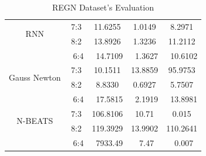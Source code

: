 \documentclass{ieeeojies}
\begin{document}
\begin{table}[H]
\begin{tabular}{|c|c|c|c|c|}
         \hline
         \multirow{2}{*}{RNN} & 7:3 & 11.6255 & 1.0149 & 8.2971 \\ & 8:2 & 13.8926 & 1.3236 & 11.2112 \\ & \ 6:4} & \ 14.7109 & \ 1.3627 & \ 10.6102\\
         \hline
         \multirow{2}{*}{Gauss Newton} & 7:3 & 10.1511 & 13.8859 & 95.9753 \\ & 8:2 & 8.8330 & 0.6927 & 5.7507 \\ & \ 6:4} & \ 17.5815 & \ 2.1919 & \ 13.8981\\
         \hline
         \multirow{2}{*}{N-BEATS} & 7:3 & 106.8106 & 10.71 & 0.015 \\ & 8:2 & 119.3929 & 13.9902 & 110.2641 \\ & \ 6:4} & \ 7933.49 & \ 7.47 & \ 0.007\\
         \hline
    \end{tabular}
    \caption{REGN Dataset's Evaluation}
    \label{REGNresult}
\end{table}
\end{document}
